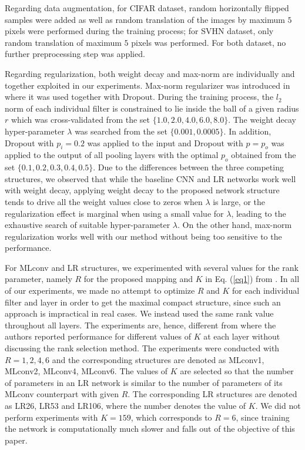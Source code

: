 \documentclass[conference,usletter]{IEEEtran}
\begin{document}
Regarding data augmentation, for CIFAR dataset, random horizontally flipped samples were added as well as random translation of the images by maximum $5$ pixels were performed during the training process; for SVHN dataset, only random translation of maximum $5$ pixels was performed. For both dataset, no further preprocessing step was applied.

Regarding regularization, both weight decay and max-norm \cite{srivastava2014dropout} are individually and together exploited in our experiments. Max-norm regularizer was introduced in \cite{srivastava2014dropout} where it was used together with Dropout. During the training process, the $l_2$ norm of each individual filter is constrained to lie inside the ball of a given radius $r$ which was cross-validated from the set $\{1.0,2.0,4.0,6.0,8.0\}$. The weight decay hyper-parameter $\lambda$ was searched from the set $\{0.001,0.0005\}$. In addition, Dropout with $p_i=0.2$ was applied to the input and Dropout with $p = p_o$  was applied to the output of all pooling layers with the optimal $p_o$ obtained from the set $\{0.1,0.2,0.3,0.4,0.5\}$. Due to the differences between the three competing structures, we observed that while the baseline CNN and LR networks work well with weight decay, applying weight decay to the proposed network structure tends to drive all the weight values close to zeros when $\lambda$ is large, or the regularization effect is marginal when using a small value for $\lambda$, leading to the exhaustive search of suitable hyper-parameter $\lambda$. On the other hand, max-norm regularization works well with our method without being too sensitive to the performance.

For MLconv and LR structures, we experimented with several values for the rank parameter, namely $R$ for the proposed mapping and $K$ in Eq. (\ref{eq1}) from \cite{tai2015convolutional}. In all of our experiments, we made no attempt to optimize $R$ and $K$ for each individual filter and layer in order to get the maximal compact structure, since such an approach is impractical in real cases. We instead used the same rank value throughout all layers. The experiments are, hence, different from \cite{tai2015convolutional} where the authors reported performance for different values of $K$ at each layer without discussing the rank selection method. The experiments were conducted with $R={1,2,4,6}$ and the corresponding structures are denoted as MLconv1, MLconv2, MLconv4, MLconv6. The values of $K$ are selected so that the number of parameters in an LR network is similar to the number of parameters of its MLconv counterpart with given $R$. The corresponding LR structures are denoted as LR26, LR53 and LR106, where the number denotes the value of $K$. We did not perform experiments with $K=159$, which corresponds to $R=6$, since training the network is computationally much slower and falls out of the objective of this paper.
\end{document}
